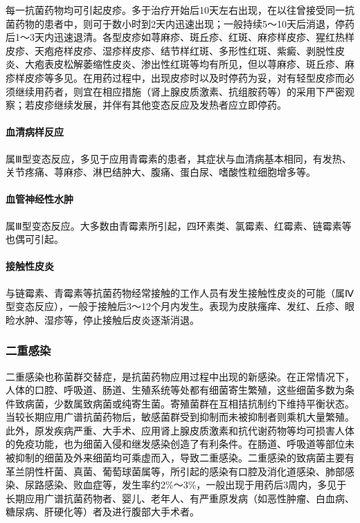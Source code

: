 每一抗菌药物均可引起皮疹。多于治疗开始后10天左右出现，在以往曾接受同一抗菌药物的患者中，则可于数小时到2天内迅速出现；一般持续5～10天后消退，停药后1～3天内迅速退清。各型皮疹如荨麻疹、斑丘疹、红斑、麻疹样皮疹、猩红热样皮疹、天疱疮样皮疹、湿疹样皮疹、结节样红斑、多形性红斑、紫癜、剥脱性皮炎、大疱表皮松解萎缩性皮炎、渗出性红斑等均有所见，但以荨麻疹、斑丘疹、麻疹样皮疹等多见。在用药过程中，出现皮疹时以及时停药为妥，对有轻型皮疹而必须继续用药者，则宜在相应措施（肾上腺皮质激素、抗组胺药等）的采用下严密观察；若皮疹继续发展，并伴有其他变态反应及发热者应立即停药。

\paragraph{血清病样反应}

属Ⅲ型变态反应，多见于应用青霉素的患者，其症状与血清病基本相同，有发热、关节疼痛、荨麻疹、淋巴结肿大、腹痛、蛋白尿、嗜酸性粒细胞增多等。

\paragraph{血管神经性水肿}

属Ⅲ型变态反应。大多数由青霉素所引起，四环素类、氯霉素、红霉素、链霉素等也偶可引起。

\paragraph{接触性皮炎}

与链霉素、青霉素等抗菌药物经常接触的工作人员有发生接触性皮炎的可能（属Ⅳ型变态反应），一般于接触后3～12个月内发生。表现为皮肤瘙痒、发红、丘疹、眼睑水肿、湿疹等，停止接触后皮炎逐渐消退。

\subsubsection{二重感染}

二重感染也称菌群交替症，是抗菌药物应用过程中出现的新感染。在正常情况下，人体的口腔、呼吸道、肠道、生殖系统等处都有细菌寄生繁殖，这些细菌多数为条件致病菌，少数属致病菌或纯寄生菌。寄殖菌群在互相拮抗制约下维持平衡状态。当较长期应用广谱抗菌药物后，敏感菌群受到抑制而未被抑制者则乘机大量繁殖。此外，原发疾病严重、大手术、应用肾上腺皮质激素和抗代谢药物等均可损害人体的免疫功能，也为细菌入侵和继发感染创造了有利条件。在肠道、呼吸道等部位未被抑制的细菌及外来细菌均可乘虚而入，导致二重感染。二重感染的致病菌主要有革兰阴性杆菌、真菌、葡萄球菌属等，所引起的感染有口腔及消化道感染、肺部感染、尿路感染、败血症等，发生率约2\%～3\%，一般出现于用药后3周内，多见于长期应用广谱抗菌药物者、婴儿、老年人、有严重原发病（如恶性肿瘤、白血病、糖尿病、肝硬化等）者及进行腹部大手术者。

